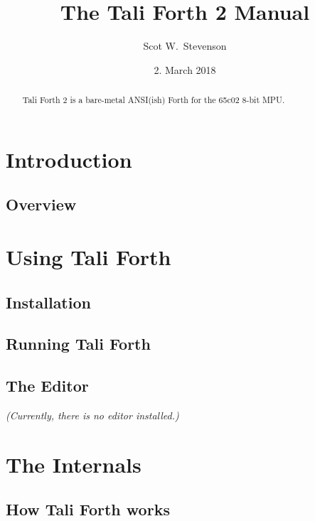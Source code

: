 \documentclass[a4paper,notitlepage]{report}
\title{The Tali Forth 2 Manual}
\author{Scot W.~Stevenson}
\date{2. March 2018}
\begin{document}
\maketitle

\begin{abstract}
Tali Forth 2 is a bare-metal ANSI(ish) Forth for the 65c02 8-bit MPU.
\end{abstract}

\tableofcontents
\listoftables

\part{Introduction}

\chapter{Overview}
        

\part{Using Tali Forth}

\chapter{Installation}
        

\chapter{Running Tali Forth}
        

\chapter{The Editor}
\textit{(Currently, there is no editor installed.)}


\part{The Internals}

\chapter{How Tali Forth works}
        
\end{document}
